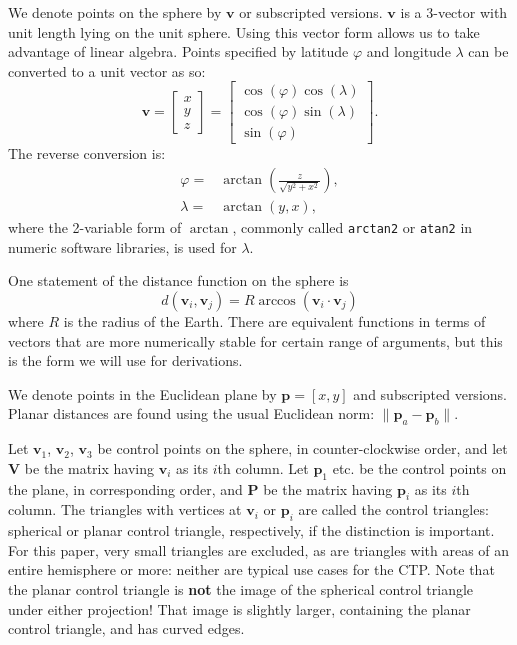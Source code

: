 \documentclass[]{interact}
\begin{document}
We denote points on the sphere by $\mathbf v$ or subscripted versions.
$\mathbf v$ is a 3-vector with unit length lying on the unit sphere.
Using this vector form allows us to take advantage of linear algebra.
Points specified by latitude $\varphi$ and longitude $\lambda$
can be converted to a unit vector as so:\citep{kent}
\begin{equation}
\mathbf v =
\begin{bmatrix*}
  x \\ y \\ z
\end{bmatrix*}
=
\begin{bmatrix*}
 \cos(\varphi) \cos(\lambda) \\
 \cos(\varphi) \sin(\lambda) \\
 \sin(\varphi)
\end{bmatrix*}.
\end{equation}
The reverse conversion is:
\begin{equation}\begin{split}
  \varphi =& \arctan\left(\frac{z}{\sqrt{y^2 + x^2}}\right), \\
  \lambda =& \arctan\left(y, x\right),
\end{split}\end{equation}
where the 2-variable form of $\arctan$, commonly called \texttt{arctan2} or
\texttt{atan2} in numeric software libraries, is used for $\lambda$.

One statement of the distance function on the sphere is
\begin{equation}
d\left(\mathbf v_i, \mathbf v_j\right)
= R \arccos\left(\mathbf v_i \cdot \mathbf v_j\right)
\end{equation}
where $R$ is the radius of the Earth. There are equivalent functions in terms
of vectors that are more numerically stable for certain range of arguments,
but this is the form we will use for derivations.

We denote points in the Euclidean plane by $\mathbf p = [x, y]$ and
subscripted versions. Planar distances are found using the usual
Euclidean norm: $\|\mathbf p_a - \mathbf p_b\|$.

Let $\mathbf v_1$, $\mathbf v_2$, $\mathbf v_3$ be control points on the
sphere, in counter-clockwise order, and let $\mathbf V$ be the matrix having
$\mathbf v_i$ as its $i$th column. Let $\mathbf p_1$ etc. be the control points
on the plane, in corresponding order, and $\mathbf P$ be the matrix having
$\mathbf p_i$ as its $i$th column. The triangles with vertices at $\mathbf v_i$
or $\mathbf p_i$ are called the control triangles: spherical or planar control
triangle, respectively, if the distinction is important. For this paper,
very small triangles are excluded, as are triangles with areas of an entire
hemisphere or more: neither are typical use cases for the CTP.
Note that the planar control triangle is \textbf{not} the image of the
spherical control triangle under either projection! That image is
slightly larger, containing the planar control triangle, and has curved edges.
\end{document}
